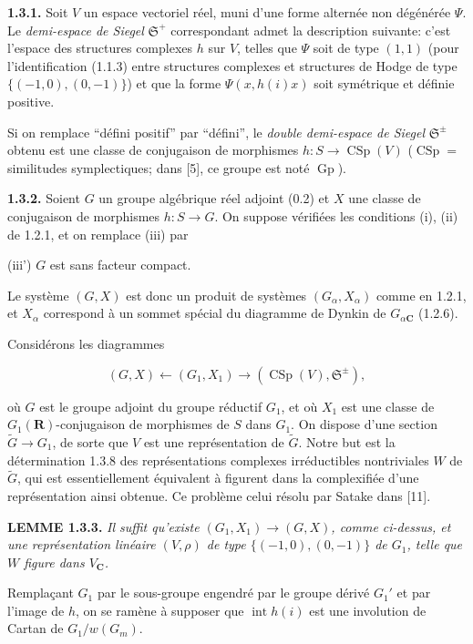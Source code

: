 \documentclass[10pt,a4paper]{article}
\newcommand{\SourcePage}[2]{\clearpage\setcounter{page}{#2}\typeout{D031_SOURCE_PAGE physical=#1 printed=#2}}
\begin{document}
\textbf{1.3.1.} Soit \(V\) un espace vectoriel réel, muni d'une forme alternée non dégénérée \(\Psi\). Le \emph{demi-espace de Siegel} \(\mathfrak S^+\) correspondant admet la description suivante: c'est l'espace des structures complexes \(h\) sur \(V\), telles que \(\Psi\) soit de type \((1,1)\) (pour l'identification (1.1.3) entre structures complexes et structures de Hodge de type \(\{(-1,0),(0,-1)\}\)) et que la forme \(\Psi(x,h(i)x)\) soit symétrique et définie positive.

Si on remplace ``défini positif'' par ``défini'', le \emph{double demi-espace de Siegel} \(\mathfrak S^{\pm}\) obtenu est une classe de conjugaison de morphismes \(h:S\to\operatorname{CSp}(V)\) (\(\operatorname{CSp}=\) similitudes symplectiques; dans {[}5{]}, ce groupe est noté \(\operatorname{Gp}\)).

\textbf{1.3.2.} Soient \(G\) un groupe algébrique réel adjoint (0.2) et \(X\) une classe de conjugaison de morphismes \(h:S\to G\). On suppose vérifiées les conditions (i), (ii) de 1.2.1, et on remplace (iii) par

\SourcePage{14}{260}
(iii') \(G\) est sans facteur compact.

Le système \((G,X)\) est donc un produit de systèmes \((G_\alpha,X_\alpha)\) comme en 1.2.1, et \(X_\alpha\) correspond à un sommet spécial du diagramme de Dynkin de \(G_{\alpha\mathbf C}\) (1.2.6).

Considérons les diagrammes

\[
(G,X)\longleftarrow(G_1,X_1)\longrightarrow(\operatorname{CSp}(V),\mathfrak S^{\pm}),
\]

où \(G\) est le groupe adjoint du groupe réductif \(G_1\), et où \(X_1\) est une classe de \(G_1(\mathbf R)\)-conjugaison de morphismes de \(S\) dans \(G_1\). On dispose d'une section \(\widetilde G\to G_1\), de sorte que \(V\) est une représentation de \(\widetilde G\). Notre but est la détermination 1.3.8 des représentations complexes irréductibles nontriviales \(W\) de \(\widetilde G\), qui est essentiellement équivalent à figurent dans la complexifiée d'une représentation ainsi obtenue. Ce problème celui résolu par Satake dans {[}11{]}.

\textbf{LEMME 1.3.3.} \emph{Il suffit qu'existe \((G_1,X_1)\to(G,X)\), comme ci-dessus, et une représentation linéaire \((V,\rho)\) de type \(\{(-1,0),(0,-1)\}\) de \(G_1\), telle que \(W\) figure dans \(V_{\mathbf C}\).}

Remplaçant \(G_1\) par le sous-groupe engendré par le groupe dérivé \(G_1'\) et par l'image de \(h\), on se ramène à supposer que \(\operatorname{int}h(i)\) est une involution de Cartan de \(G_1/w(G_m)\).
\end{document}
